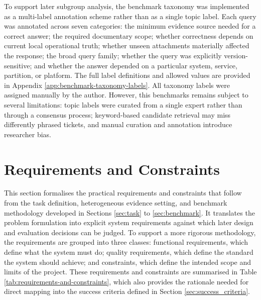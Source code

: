 To support later subgroup analysis, the benchmark taxonomy was implemented as a multi-label annotation scheme rather than as a single topic label. Each query was annotated across seven categories: the minimum evidence source needed for a correct answer; the required documentary scope; whether correctness depends on current local operational truth; whether unseen attachments materially affected the response; the broad query family; whether the query was explicitly version-sensitive; and whether the answer depended on a particular system, service, partition, or platform. The full label definitions and allowed values are provided in Appendix \ref{app:benchmark-taxonomy-labels}. All taxonomy labels were assigned manually by the author. However, this benchmarks remains subject to several limitations: topic labels were curated from a single expert rather than through a consensus process; keyword-based candidate retrieval may miss differently phrased tickets, and manual curation and annotation introduce researcher bias. 

\section{Requirements and Constraints}
\label{sec:requirements_and_constraints}

This section formalises the practical requirements and constraints that follow from the task definition, heterogeneous evidence setting, and benchmark methodology developed in Sections \ref{sec:task} to \ref{sec:benchmark}. It translates the problem formulation into explicit system requirements against which later design and evaluation decisions can be judged. To support a more rigorous methodology, the requirements are grouped into three classes: functional requirements, which define what the system must do; quality requirements, which define the standard the system should achieve; and constraints, which define the intended scope and limits of the project. These requirements and constraints are summarised in Table \ref{tab:requirements-and-constraints}, which also provides the rationale needed for direct mapping into the success criteria defined in Section \ref{sec:success_criteria}.

\begingroup
\footnotesize
\setlength{\tabcolsep}{4pt}
\renewcommand{\arraystretch}{1.15}

